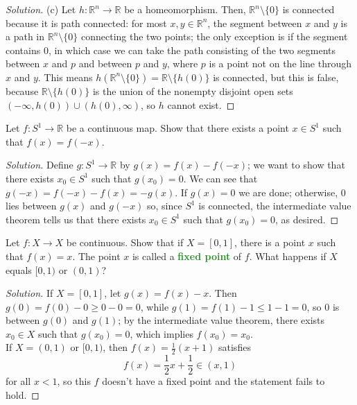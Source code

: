 \documentclass[10pt]{article}
\providecommand{\half}{\frac{1}{2}}
\providecommand{\RR}{\mathbb R}
\newenvironment{soln}{\begin{proof}[Solution]}{\end{proof}}
\providecommand{\vocab}[1]{{\textbf{\textcolor{ForestGreen}{#1}}}}
\begin{document}
\begin{soln}
    (c) Let $h\colon\RR^n\to\RR$ be a homeomorphism.
    Then, $\RR^n\setminus\{0\}$ is connected because it is path connected:
    for most $x,y\in\RR^n$, the segment between $x$ and $y$ is a path
    in $\RR^n\setminus\{0\}$ connecting the two points;
    the only exception is if the segment contains $0$, in which case
    we can take the path consisting of the two segments
    between $x$ and $p$ and between $p$ and $y$, where
    $p$ is a point not on the line through $x$ and $y$.
    This means $h(\RR^n\setminus\{0\}) = \RR\setminus\{h(0)\}$ is connected,
    but this is false, because $\RR\setminus\{h(0)\}$ is the union
    of the nonempty disjoint open sets $(-\infty,h(0))\cup(h(0),\infty)$,
    so $h$ cannot exist.
\end{soln}

\pagebreak

\begin{problem}
    [Munkres 24.2]
    Let $f\colon S^1\to\RR$ be a continuous map.
    Show that there exists a point $x\in S^1$ such that $f(x) = f(-x)$.
\end{problem}

\begin{soln}
    Define $g\colon S^1\to\RR$ by $g(x) = f(x) - f(-x)$;
    we want to show that there exists $x_0\in S^1$ such that $g(x_0) = 0$.
    We can see that $g(-x) = f(-x) - f(x) = -g(x)$.
    If $g(x) = 0$ we are done; otherwise, $0$ lies between $g(x)$ and $g(-x)$
    so, since $S^1$ is connected, the intermediate value theorem tells us
    that there exists $x_0\in S^1$ such that $g(x_0) = 0$, as desired.
\end{soln}

\begin{problem}
    [Munkres 24.3]
    Let $f\colon X\to X$ be continuous.
    Show that if $X = [0,1]$, there is a point $x$ such that $f(x) = x$.
    The point $x$ is called a \vocab{fixed point} of $f$.
    What happens if $X$ equals $[0,1)$ or $(0,1)$?
\end{problem}

\begin{soln}
    If $X = [0,1]$, let $g(x) = f(x) - x$. Then $g(0) = f(0) - 0 \ge 0-0 = 0$,
    while $g(1) = f(1)-1 \le 1-1 = 0$, so $0$ is between $g(0)$ and $g(1)$;
    by the intermediate value theorem,
    there exists $x_0\in X$ such that $g(x_0) = 0$, which implies $f(x_0) = x_0$.
    \\

    If $X = (0,1)$ or $[0,1)$, then $f(x) = \half(x + 1)$ satisfies
    \begin{equation*}
        f(x) = \half x + \half \in(x,1)
    \end{equation*}
    for all $x < 1$, so this $f$ doesn't have a fixed point
    and the statement fails to hold.
\end{soln}
\end{document}
